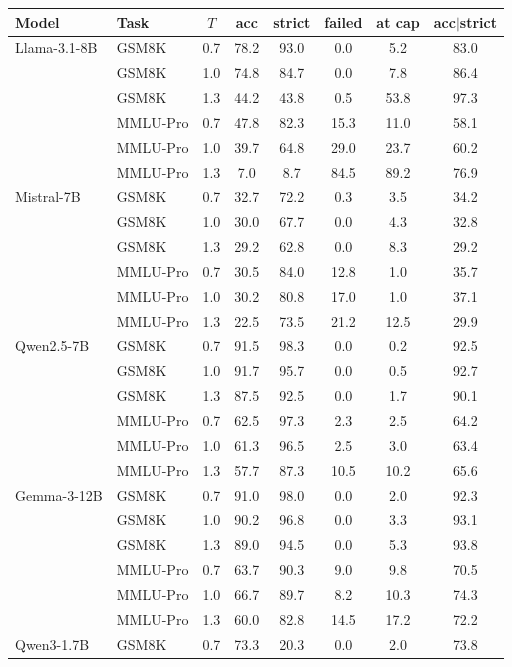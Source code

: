 \begin{tabular}{llcccccc}
\toprule
Model & Task & $T$ & acc & strict & failed & at cap & acc$|$strict \\
\midrule
Llama-3.1-8B & GSM8K & 0.7 & 78.2 & 93.0 & 0.0 & 5.2 & 83.0 \\
 & GSM8K & 1.0 & 74.8 & 84.7 & 0.0 & 7.8 & 86.4 \\
 & GSM8K & 1.3 & 44.2 & 43.8 & 0.5 & 53.8 & 97.3 \\
 & MMLU-Pro & 0.7 & 47.8 & 82.3 & 15.3 & 11.0 & 58.1 \\
 & MMLU-Pro & 1.0 & 39.7 & 64.8 & 29.0 & 23.7 & 60.2 \\
 & MMLU-Pro & 1.3 & 7.0 & 8.7 & 84.5 & 89.2 & 76.9 \\
\midrule
Mistral-7B & GSM8K & 0.7 & 32.7 & 72.2 & 0.3 & 3.5 & 34.2 \\
 & GSM8K & 1.0 & 30.0 & 67.7 & 0.0 & 4.3 & 32.8 \\
 & GSM8K & 1.3 & 29.2 & 62.8 & 0.0 & 8.3 & 29.2 \\
 & MMLU-Pro & 0.7 & 30.5 & 84.0 & 12.8 & 1.0 & 35.7 \\
 & MMLU-Pro & 1.0 & 30.2 & 80.8 & 17.0 & 1.0 & 37.1 \\
 & MMLU-Pro & 1.3 & 22.5 & 73.5 & 21.2 & 12.5 & 29.9 \\
\midrule
Qwen2.5-7B & GSM8K & 0.7 & 91.5 & 98.3 & 0.0 & 0.2 & 92.5 \\
 & GSM8K & 1.0 & 91.7 & 95.7 & 0.0 & 0.5 & 92.7 \\
 & GSM8K & 1.3 & 87.5 & 92.5 & 0.0 & 1.7 & 90.1 \\
 & MMLU-Pro & 0.7 & 62.5 & 97.3 & 2.3 & 2.5 & 64.2 \\
 & MMLU-Pro & 1.0 & 61.3 & 96.5 & 2.5 & 3.0 & 63.4 \\
 & MMLU-Pro & 1.3 & 57.7 & 87.3 & 10.5 & 10.2 & 65.6 \\
\midrule
Gemma-3-12B & GSM8K & 0.7 & 91.0 & 98.0 & 0.0 & 2.0 & 92.3 \\
 & GSM8K & 1.0 & 90.2 & 96.8 & 0.0 & 3.3 & 93.1 \\
 & GSM8K & 1.3 & 89.0 & 94.5 & 0.0 & 5.3 & 93.8 \\
 & MMLU-Pro & 0.7 & 63.7 & 90.3 & 9.0 & 9.8 & 70.5 \\
 & MMLU-Pro & 1.0 & 66.7 & 89.7 & 8.2 & 10.3 & 74.3 \\
 & MMLU-Pro & 1.3 & 60.0 & 82.8 & 14.5 & 17.2 & 72.2 \\
\midrule
Qwen3-1.7B & GSM8K & 0.7 & 73.3 & 20.3 & 0.0 & 2.0 & 73.8 \\

\end{tabular}
